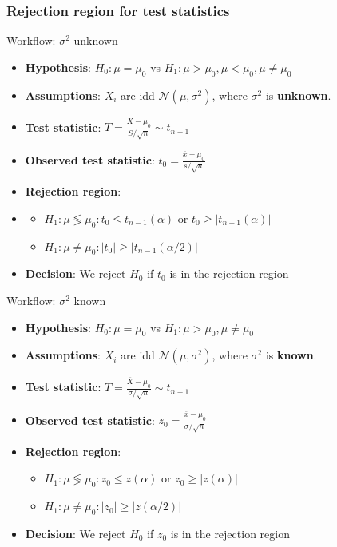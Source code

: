 \documentclass[a4paper]{article}\usepackage[]{graphicx}\usepackage[]{xcolor}
\begin{document}
\subsubsection{Rejection region for test statistics}
\begin{redbox}{Workflow: \( \sigma^2 \) unknown}
	\begin{itemize}
		\item \textbf{Hypothesis}: \( H_0: \mu = \mu_0 \) vs \( H_1: \mu > \mu_0, \mu < \mu_0, \mu \neq \mu_0 \)
		\item \textbf{Assumptions}: \( X_i \) are idd \( \mathcal{N}(\mu,\sigma^2) \), where \( \sigma^2 \) is \textcolor{myblue}{\textbf{unknown}}.
		\item \textbf{Test statistic}: \( T = \frac{\overline{X}-\mu_0}{S/\sqrt{n}} \sim t_{n-1} \)
		\item \textbf{Observed test statistic}: \( t_0 = \frac{\overline{x}-\mu_0}{s/\sqrt{n}} \)
		\item \textbf{Rejection region}:
		\item \begin{itemize}
			\item \( H_1: \mu \lessgtr \mu_0: t_0 \leq t_{n-1}(\alpha) \) or \( t_0 \geq \lvert t_{n-1}(\alpha) \rvert \)
			\item \( H_1: \mu \neq \mu_0: \lvert t_0 \rvert \geq \lvert t_{n-1} (\alpha / 2) \rvert \) 
		\end{itemize}
		\item \textbf{Decision}: We reject \( H_0 \) if \( t_0 \) is in the rejection region
	\end{itemize}
\end{redbox}
\begin{redbox}{Workflow: \( \sigma^2 \) known}
	\begin{itemize}
		\item \textbf{Hypothesis}: \( H_0: \mu = \mu_0 \) vs \( H_1: \mu > \mu_0, \mu \neq \mu_0 \)
		\item \textbf{Assumptions}: \( X_i \) are idd \( \mathcal{N}(\mu,\sigma^2) \), where \( \sigma^2 \) is \textcolor{myblue}{\textbf{known}}.
		\item \textbf{Test statistic}: \( T = \frac{\overline{X}-\mu_0}{\sigma/\sqrt{n}} \sim t_{n-1} \)
		\item \textbf{Observed test statistic}: \( z_0 = \frac{\overline{x}-\mu_0}{\sigma/\sqrt{n}} \)
		\item \textbf{Rejection region}:
		\begin{itemize}
			\item \( H_1: \mu \lessgtr \mu_0: z_0 \leq z(\alpha) \) or \( z_0 \geq \lvert z(\alpha) \rvert \)
			\item \( H_1: \mu \neq \mu_0: \lvert z_0 \rvert \geq \lvert z(\alpha / 2) \rvert \) 
		\end{itemize}
		\item \textbf{Decision}: We reject \( H_0 \) if \( z_0 \) is in the rejection region
	\end{itemize}
\end{redbox}
\end{document}
